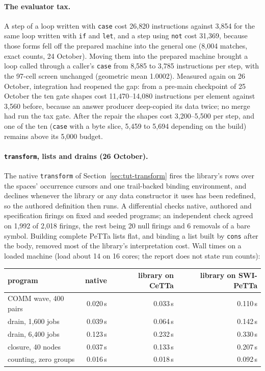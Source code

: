 \documentclass[11pt]{article}
\newcommand{\code}[1]{\texttt{#1}}
\newcommand{\PeTTa}{\textup{PeTTa}}
\newcommand{\CeTTa}{\textup{CeTTa}}
\begin{document}
\paragraph{The evaluator tax.}  A step of a loop written with \code{case}
cost 26{,}820 instructions against 3{,}854 for the same loop written with
\code{if} and \code{let}, and a step using \code{not} cost 31{,}369, because
those forms fell off the prepared machine into the general one (8{,}004
matches, exact counts, 24 October).  Moving them into the prepared machine
brought a loop called through a caller's \code{case} from 8{,}585 to 3{,}785
instructions per step, with the 97-cell screen unchanged (geometric mean
1.0002).  Measured again on 26 October, integration had reopened the gap:
from a pre-main checkpoint of 25 October the ten gate shapes cost
11{,}470--14{,}080 instructions per element against 3{,}560 before, because
an answer producer deep-copied its data twice; no merge had run the tax gate.
After the repair the shapes cost 3{,}200--5{,}500 per step, and one of the ten
(\code{case} with a byte slice, 5{,}459 to 5{,}694 depending on the build)
remains above its 5{,}000 budget.

\paragraph{\code{transform}, lists and drains (26 October).}  The native
\code{transform} of Section~\ref{sec:tut-transform} fires the library's
rows over the spaces' occurrence cursors and one trail-backed binding
environment, and declines whenever the library or any data constructor it
uses has been redefined, so the authored definition then runs.  A
differential checks native, authored and specification firings on fixed and
seeded programs; an independent check agreed on 1{,}992 of 2{,}018 firings,
the rest being 20 null firings and 6 removals of a bare symbol.  Building
complete \PeTTa{} lists flat, and binding a list built by \code{cons} after
the body, removed most of the library's interpretation cost.  Wall times on a
loaded machine (load about 14 on 16 cores; the report does not state run
counts):

\begin{center}
\small
\begin{tabular}{@{}lrrr@{}}
\toprule
program & native & library on \CeTTa{} & library on SWI-\PeTTa{} \\
\midrule
COMM wave, 400 pairs & 0.020\,s & 0.033\,s & 0.110\,s \\
drain, 1{,}600 jobs & 0.039\,s & 0.064\,s & 0.142\,s \\
drain, 6{,}400 jobs & 0.123\,s & 0.232\,s & 0.330\,s \\
closure, 40 nodes & 0.037\,s & 0.133\,s & 0.207\,s \\
counting, zero groups & 0.016\,s & 0.018\,s & 0.092\,s \\
\bottomrule
\end{tabular}
\end{center}
\end{document}
